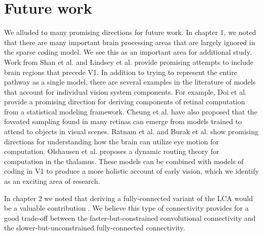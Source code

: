 \section{Future work}\label{sec:ch5_future_work}
We alluded to many promising directions for future work.
In chapter 1, we noted that there are many important brain processing areas that are largely ignored in the sparse coding model. %
We see this as an important area for additional study.
Work from Shan et al. \citeyearpar{shan2013efficient} and Lindsey et al. \citeyearpar{lindsey2019unified} provide promising attempts to include brain regions that precede V1.
In addition to trying to represent the entire pathway as a single model, there are several examples in the literature of models that account for individual vision system components.
For example, Doi et al. \citeyearpar{doi2007theory} provide a promising direction for deriving components of retinal computation from a statistical modeling framework.
Cheung et al. \citeyearpar{cheung2016emergence} have also proposed that the foveated sampling found in many retinas can emerge from models trained to attend to objects in visual scenes.
Ratnam et al. \citeyearpar{ratnam2017benefits} and Burak et al. \citeyearpar{burak2010bayesian} show promising directions for understanding how the brain can utilize eye motion for computation.
Olshausen et al. \citeyearpar{olshausen1993neurobiological} proposes a dynamic routing theory for computation in the thalamus.
These models can be combined with models of coding in V1 to produce a more holistic account of early vision, which we identify as an exciting area of research.

In chapter 2 we noted that deriving a fully-connected variant of the LCA would be a valuable contribution \parencite{le2011building, ngiam2010tiled}. %
We believe this type of connectivity provides for a good trade-off between the faster-but-constrained convolutional connectivity and the slower-but-unconstrained fully-connected connectivity.

